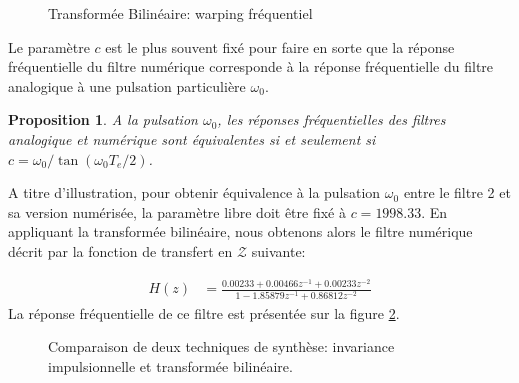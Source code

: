 \documentclass[11pt,a4paper]{IEEEtran}
\newtheorem{proposition}{Proposition}
\begin{document}
\begin{figure}
\centering
{}
\caption{Transformée Bilinéaire: warping fréquentiel}\label{fig_warp}
\end{figure}

Le paramètre $c$ est le plus souvent fixé pour faire en sorte que la réponse fréquentielle du filtre numérique corresponde à la réponse fréquentielle du filtre analogique à une pulsation particulière $\omega_0$.

\begin{proposition}
A la pulsation $\omega_0$, les réponses fréquentielles des filtres analogique et numérique sont équivalentes si et seulement si $c=\omega_0 / \tan(\omega_0 T_e/2)$.
\end{proposition}

A titre d'illustration, pour obtenir équivalence à la pulsation $\omega_0$ entre le filtre 2 et sa version numérisée, la paramètre libre doit être fixé à $c=1998.33$. En appliquant la transformée bilinéaire, nous obtenons alors le filtre numérique décrit par la fonction de transfert en $\mathcal{Z}$ suivante:

\begin{align}
H(z)&=\frac{0.00233+0.00466z^{-1}+ 0.00233z^{-2}}{1-1.85879z^{-1}+ 0.86812z^{-2}}
\end{align}
La réponse fréquentielle de ce filtre est présentée sur la figure \ref{fig_comp_iir}.

\begin{figure}[t]
\centering
{}
\caption{Comparaison de deux techniques de synthèse: invariance impulsionnelle et transformée bilinéaire.}\label{fig_comp_iir}
\end{figure}
\end{document}
